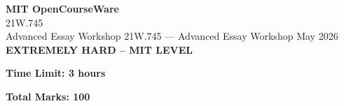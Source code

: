 \documentclass[12pt,a4paper]{exam}
\begin{document}
\begin{center}
{\LARGE \textbf{MIT OpenCourseWare}}\\21W.745\\Advanced Essay Workshop
\vspace{0.5cm}
{21W.745} --- {Advanced Essay Workshop}
\vspace{0.3cm}
May 2026
\vspace{0.3cm}
\textbf{EXTREMELY HARD -- MIT LEVEL}
\end{center}

\begin{center}
\textbf{Time Limit: 3 hours}
\end{center}

\begin{center}
\textbf{Total Marks: 100}
\end{center}

\vspace{0.5cm}
\end{document}
